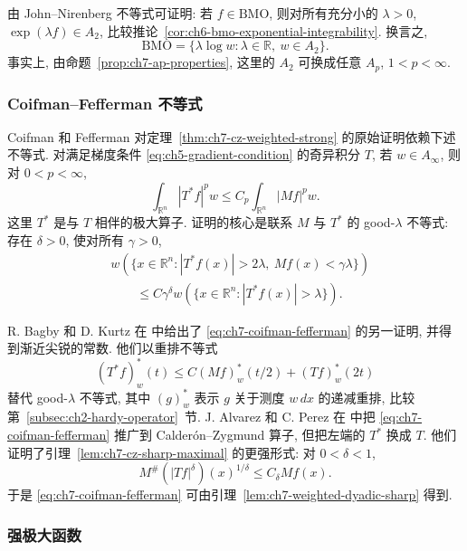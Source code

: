 由 John--Nirenberg 不等式可证明: 若 $f\in\mathrm{BMO}$, 则对所有充分小的 $\lambda>0$, $\exp(\lambda f)\in A_2$, 比较推论~\ref{cor:ch6-bmo-exponential-integrability}. 换言之,
\[
 \mathrm{BMO}=\{\lambda\log w:\lambda\in\mathbb R,\ w\in A_2\}.
\]
事实上, 由命题~\ref{prop:ch7-ap-properties}, 这里的 $A_2$ 可换成任意 $A_p$, $1<p<\infty$.

\hypertarget{chapter-07-page-164}{}
\subsubsection{Coifman--Fefferman 不等式}
\label{subsec:ch7-coifman-fefferman}

Coifman 和 Fefferman 对定理~\ref{thm:ch7-cz-weighted-strong} 的原始证明依赖下述不等式. 对满足梯度条件 \eqref{eq:ch5-gradient-condition} 的奇异积分 $T$, 若 $w\in A_\infty$, 则对 $0<p<\infty$,
\begin{equation}
\label{eq:ch7-coifman-fefferman}
 \int_{\mathbb R^n}|T^*f|^pw
 \le C_p\int_{\mathbb R^n}|Mf|^pw.
\end{equation}
这里 $T^*$ 是与 $T$ 相伴的极大算子. 证明的核心是联系 $M$ 与 $T^*$ 的 good-$\lambda$ 不等式: 存在 $\delta>0$, 使对所有 $\gamma>0$,
\[
\begin{aligned}
 &w(\{x\in\mathbb R^n:|T^*f(x)|>2\lambda,\ Mf(x)<\gamma\lambda\})\\
 &\qquad\le C\gamma^\delta
 w(\{x\in\mathbb R^n:|T^*f(x)|>\lambda\}).
\end{aligned}
\]

R. Bagby 和 D. Kurtz 在  中给出了 \eqref{eq:ch7-coifman-fefferman} 的另一证明, 并得到渐近尖锐的常数. 他们以重排不等式
\[
 (T^*f)_w^*(t)\le C(Mf)_w^*(t/2)+(Tf)_w^*(2t)
\]
替代 good-$\lambda$ 不等式, 其中 $(g)_w^*$ 表示 $g$ 关于测度 $w\,dx$ 的递减重排, 比较第~\ref{subsec:ch2-hardy-operator}~节. J. Alvarez 和 C. Perez 在  中把 \eqref{eq:ch7-coifman-fefferman} 推广到 Calderón--Zygmund 算子, 但把左端的 $T^*$ 换成 $T$. 他们证明了引理~\ref{lem:ch7-cz-sharp-maximal} 的更强形式: 对 $0<\delta<1$,
\[
 M^\#(|Tf|^\delta)(x)^{1/\delta}\le C_\delta Mf(x).
\]
于是 \eqref{eq:ch7-coifman-fefferman} 可由引理~\ref{lem:ch7-weighted-dyadic-sharp} 得到.

\subsubsection{强极大函数}
\label{subsec:ch7-strong-maximal-function}

